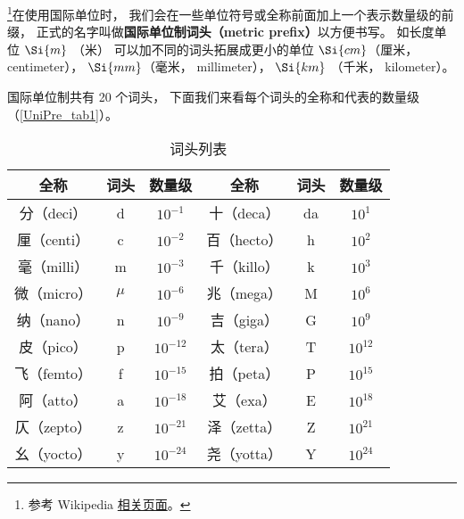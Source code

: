 

\footnote{参考 Wikipedia \href{https://en.wikipedia.org/wiki/Metric_prefix}{相关页面}。}在使用国际单位时， 我们会在一些单位符号或全称前面加上一个表示数量级的前缀， 正式的名字叫做\textbf{国际单位制词头（metric prefix）}以方便书写。 如长度单位 $\Si{m}$ （米） 可以加不同的词头拓展成更小的单位 $\Si{cm}$（厘米， centimeter）， $\Si{mm}$（毫米， millimeter）， $\Si{km}$ （千米， kilometer）。

国际单位制共有 20 个词头， 下面我们来看每个词头的全称和代表的数量级（\autoref{UniPre_tab1}）。

\begin{table}[ht]
\centering
\caption{词头列表}\label{UniPre_tab1}
\begin{tabular}{|c|c|c|c|c|c|}
\hline
全称 & 词头 & 数量级 & 全称 & 词头 & 数量级 \\
\hline
分（deci） & d & $10^{-1}$ & 十（deca） & da & $10^1$ \\
\hline
厘（centi） & c & $10^{-2}$ & 百（hecto） & h & $10^2$ \\
\hline
毫（milli） & m & $10^{-3}$ & 千（killo） & k & $10^3$ \\
\hline
微（micro） & $\mu$ & $10^{-6}$ & 兆（mega） & M & $10^6$ \\
\hline
纳（nano） & n & $10^{-9}$ & 吉（giga） & G & $10^9$ \\
\hline
皮（pico） & p & $10^{-12}$ & 太（tera） & T & $10^{12}$ \\
\hline
飞（femto） & f & $10^{-15}$ & 拍（peta） & P & $10^{15}$ \\
\hline
阿（atto） & a & $10^{-18}$ & 艾（exa） & E & $10^{18}$ \\
\hline
仄（zepto） & z & $10^{-21}$ & 泽（zetta） & Z & $10^{21}$ \\
\hline
幺（yocto） & y & $10^{-24}$ & 尧（yotta） & Y & $10^{24}$ \\
\hline
\end{tabular}
\end{table}
